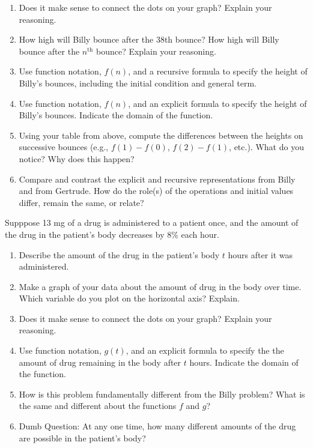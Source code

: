 \begin{prob}
\begin{enumerate}
\item Does it make sense to connect the dots on your graph?  Explain your reasoning.  

\item How high will Billy bounce after the 38th bounce?  How high will Billy bounce after the $n^\mathrm{th}$ bounce?  Explain your reasoning. 

\item  Use function notation, $f(n)$, and a recursive formula to specify the height of Billy's bounces, including the initial condition and general term.   

\item Use function notation, $f(n)$, and an explicit formula to specify the height of Billy's bounces.  Indicate the domain of the function.    

\item Using your table from above, compute the differences between the heights on successive bounces (e.g.,  $f(1) - f(0)$, $f(2) - f(1)$, etc.).  What do you notice?  Why does this happen?

\item Compare and contrast the explicit and recursive representations from Billy and from Gertrude.  How do the role(s) of the operations and initial values differ, remain the same, or relate?
\end{enumerate}
\end{prob}

\begin{prob}
Supppose 13 mg of a drug is administered to a patient once, and the amount of the drug in the patient's body decreases by 8\% each hour.  
\begin{enumerate}
\item Describe the amount of the drug in the patient's body $t$ hours after it was administered.  

\item Make a graph of your data about the amount of drug in the body over time.  Which variable do you plot on the horizontal axis?  Explain.  

\item Does it make sense to connect the dots on your graph?  Explain your reasoning.  

\item Use function notation, $g(t)$, and an explicit formula to specify the the amount of drug remaining in the body after $t$ hours.  Indicate the domain of the function. 

\item How is this problem fundamentally different from the Billy problem?  What is the same and different about the functions $f$ and $g$?  

\item Dumb Question:  At any one time, how many different amounts of the drug are possible in the patient's body?
\end{enumerate}
\end{prob}
